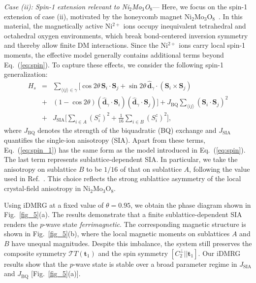 \documentclass[aps,prl,twocolumn,showpacs,superscriptaddress]{revtex4-2}
\newcommand{\bea}{\begin{eqnarray}}
\newcommand{\eea}{\end{eqnarray}}
\newcommand{\bs}{\boldsymbol}
\begin{document}
\textit{Case (ii): Spin-1 extension relevant to Ni$_2$Mo$_3$O$_8$}---
Here, we focus on the spin-1 extension of case (ii), motivated by the honeycomb magnet Ni$_2$Mo$_3$O$_8$~\cite{morey2019n, PhysRevResearch.5.033099,gao2023diffusive}. In this material, the magnetically active Ni$^{2+}$ ions occupy inequivalent tetrahedral and octahedral oxygen environments, which break bond-centered inversion symmetry and thereby allow finite DM interactions. Since the Ni$^{2+}$ ions carry local spin-1 moments, the effective model generally contains additional terms beyond Eq.~(\ref{eq:spin}). To capture these effects, we consider the following spin-1 generalization:
\bea
\nonumber
H_s &=& \sum_{\langle ij \rangle \in \gamma} \big[\cos{2\theta}\, \bs{S}_i \!\cdot\! \bs{S}_j
+ \sin{2\theta}\, \hat{\bs d}_{\gamma} \!\cdot\! (\bs{S}_i \!\times\! \bs{S}_j)
\\
\nonumber
&+& (1 - \cos{2\theta}) (\hat{\bs d}_{\gamma} \!\cdot\! \bs{S}_i)(\hat{\bs d}_{\gamma} \!\cdot\! \bs{S}_j)
\big]
+ J_{\text{BQ}} \sum_{\langle ij \rangle} (\bs{S}_i \cdot \bs{S}_j)^2
\\
&+& J_{\text{SIA}} \big[ \sum_{i \in A} (S_i^z)^2 + \frac{1}{16}\sum_{i \in B} (S_i^z)^2 \big],
\label{eq:spin_1}
\eea
where $J_{\text{BQ}}$ denotes the strength of the biquadratic (BQ) exchange and $J_{\text{SIA}}$ quantifies the single-ion anisotropy (SIA). Apart from these terms, Eq.~(\ref{eq:spin_1}) has the same form as the model introduced in Eq.~(\ref{eq:spin}). The last term represents sublattice-dependent SIA. In particular, we take the anisotropy on sublattice $B$ to be $1/16$ of that on sublattice $A$, following the value used in Ref.~. This choice reflects the strong sublattice asymmetry of the local crystal-field anisotropy in Ni$_2$Mo$_3$O$_8$.

Using iDMRG at a fixed value of $\theta=0.95$, we obtain the phase diagram shown in Fig.~\ref{fig_5}(a). The results demonstrate that a finite sublattice-dependent SIA renders the $p$-wave state \textit{ferrimagnetic}. The corresponding magnetic structure is shown in Fig.~\ref{fig_5}(b), where the local magnetic moments on sublattices $A$ and $B$ have unequal magnitudes. Despite this imbalance, the system still preserves the composite symmetry $\mathcal{T} T(\bs{t}_1)$ and the spin symmetry $[C_2^{\perp} || \bs{t}_1]$. Our iDMRG results show that the $p$-wave state is stable over a broad parameter regime in $J_{\mathrm{SIA}}$ and $J_{\mathrm{BQ}}$ [Fig.~\ref{fig_5}(a)].

\newpage
\end{document}
